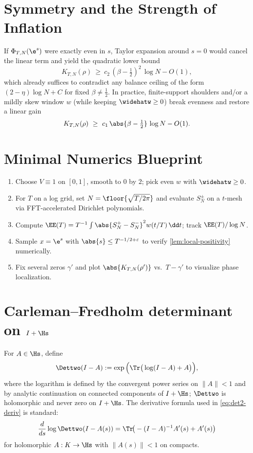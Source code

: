 \section{Symmetry and the Strength of Inflation} \label{app:symmetry}
If $\Phi_{T,N}(\e^s)$ were exactly even in $s$, Taylor expansion around $s=0$ would cancel the linear term and yield the quadratic lower bound
\[
K_{T,N}(\rho)\ \ge\ c_2\,(\beta-\tfrac12)^2\,\log N - O(1),
\]
which already suffices to contradict any balance ceiling of the form $(2-\eta)\log N+C$ for fixed $\beta\ne\tfrac12$. In practice, finite-support shoulders and/or a mildly skew window $w$ (while keeping $\widehatw\ge0$) break evenness and restore a linear gain
\[
K_{T,N}(\rho)\ \ge\ c_1\,\abs{\beta-\tfrac12}\,\log N - O(1).
\]

\section{Minimal Numerics Blueprint} \label{app:numerics}
\begin{enumerate}[leftmargin=2.25em]
  \item Choose $V\equiv1$ on $[0,1]$, smooth to $0$ by $2$; pick even $w$ with $\widehatw\ge0$.
  \item For $T$ on a log grid, set $N=\floor{\sqrt{T/2\pi}}$ and evaluate $S_N^\pm$ on a $t$-mesh via FFT-accelerated Dirichlet polynomials.
  \item Compute $\EE(T)=T^{-1}\int \abs{S_N^+-S_N^-}^2 w(t/T)\,\dd t$; track $\EE(T)/\log N$.
  \item Sample $x=\e^s$ with $\abs{s}\le T^{-1/2+\varepsilon}$ to verify \cref{lem:local-positivity} numerically.
  \item Fix several zeros $\gamma'$ and plot $\abs{K_{T,N}(\rho')}$ vs.~$T-\gamma'$ to visualize phase localization.
\end{enumerate}


\section{Carleman--Fredholm determinant on \texorpdfstring{$I+\Hs$}{I+S2}}
For \(A\in\Hs\), define
\[
\Dettwo(I-A):=\exp\Big(\Tr\big(\log(I-A)+A\big)\Big),
\]
where the logarithm is defined by the convergent power series on \(\|A\|<1\) and by analytic continuation on connected components of \(I+\Hs\); \(\Dettwo\) is holomorphic and never zero on \(I+\Hs\). The derivative formula used in \eqref{eq:det2-deriv} is standard:
\[
\frac{d}{ds}\log \Dettwo(I-A(s))=\Tr\!\big(-(I-A)^{-1}A'(s)+A'(s)\big)
\]
for holomorphic \(A:K\to\Hs\) with \(\|A(s)\|<1\) on compacts.

